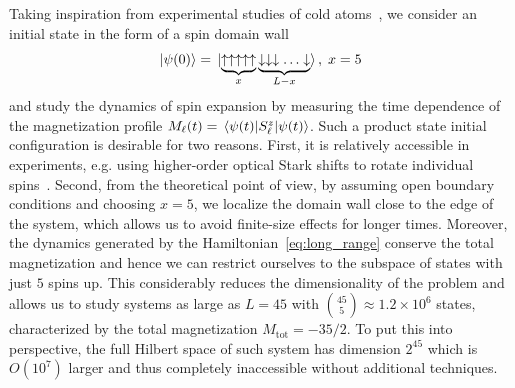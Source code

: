   Taking inspiration from experimental studies of cold atoms~\autocite{Joshi2022, Ronzheimer2013, Vidmar2013, Neyenhuis2017},
  we consider an initial state in the form of a spin domain wall
  \begin{equation}
    \ket{\psi(0)} = \ket*{\underbrace{\uparrow\uparrow\uparrow\uparrow\uparrow}_{x}
    \underbrace{\downarrow\downarrow\downarrow\ldots\downarrow}_{L-x}},\; x = 5
  \end{equation}
and study the dynamics of spin expansion by measuring the time dependence of the magnetization profile
\(M_{\ell}(t) = \matrixel{\psi(t)}{\Sz_{\ell}}{\psi(t)}\). Such a product state initial configuration is desirable for two reasons.
First, it is relatively accessible in experiments, e.g. using higher-order optical Stark shifts to rotate individual
spins~\autocite{Lee2016}. Second, from the theoretical point of view, by assuming open boundary conditions and
choosing \(x = 5\), we localize the domain wall close to the edge of the system, which allows us to avoid finite-size effects
for longer times. Moreover, the dynamics generated by the Hamiltonian~\eqref{eq:long_range} conserve the total magnetization
and hence we can restrict ourselves to the subspace of states with just \(5\) spins up. This considerably reduces
the dimensionality of the problem and allows us to study systems as large as \(L=45\) with
\(\binom{45}{5} \approx 1.2 \times 10^6\) states, characterized by the total magnetization \(M_{\mathrm{tot}} = -35/2\).
To put this into perspective, the full Hilbert space of such system
has dimension \(2^{45}\) which is \(O(10^7)\) larger and thus completely inaccessible without additional techniques.

